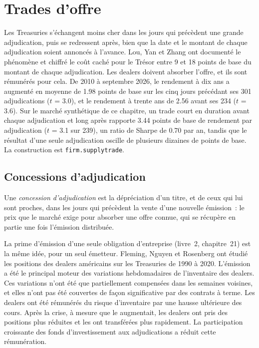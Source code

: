 \chapter{Trades d'offre}\label{ch:s2:supply-trades}

Les Treasuries s'échangent moins cher dans les jours qui précèdent une grande adjudication, puis se redressent après, bien que la date et le montant de chaque adjudication soient annoncés à l'avance. Lou, Yan
et Zhang ont documenté le phénomène et chiffré le coût caché pour le Trésor entre 9 et 18 points de base du montant de chaque adjudication. Les dealers doivent absorber l'offre,
et ils sont rémunérés pour cela. De 2010 à septembre 2026, le rendement à dix ans a augmenté en moyenne de 1.98 points de base sur les cinq jours précédant ses 301 adjudications
($t$ = 3.0), et le rendement à trente ans de 2.56 avant ses 234 ($t$ = 3.6). Sur le marché synthétique de ce chapitre, un trade court en duration avant chaque
adjudication et long après rapporte 3.44 points de base de rendement par adjudication ($t$ = 3.1 sur 239), un ratio de Sharpe de 0.70 par an, tandis que le résultat
d'une seule adjudication oscille de plusieurs dizaines de points de base. La construction est \texttt{firm.supplytrade}.

\section{Concessions d'adjudication}

\begin{definition}\label{def:s2:supply-trades:concession}
Une \emph{concession d'adjudication} est la dépréciation d'un titre, et de ceux qui lui sont proches, dans les jours qui précèdent la
vente d'une nouvelle émission~: le prix que le marché exige pour absorber une offre connue, qui se récupère en partie une fois l'émission distribuée.
\end{definition}

La prime d'émission d'une seule obligation d'entreprise (livre~2, chapitre~21) est la même idée, pour un seul émetteur. Fleming, Nguyen et Rosenberg ont étudié les positions des dealers américains
sur les Treasuries de 1990 à 2020. L'émission a été le principal moteur des variations hebdomadaires de l'inventaire des dealers. Ces variations n'ont été que partiellement compensées
dans les semaines voisines, et elles n'ont pas été couvertes de façon significative par des contrats à terme. Les dealers ont été rémunérés du risque d'inventaire par une hausse ultérieure des cours. Après la
crise, à mesure que le  augmentait, les dealers ont pris des positions plus réduites et les ont transférées plus rapidement. La participation croissante des fonds d'investissement aux adjudications
a réduit cette rémunération.

